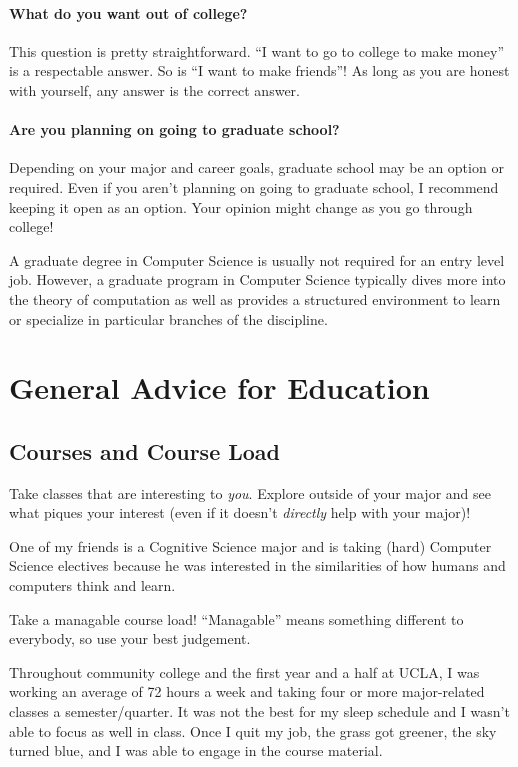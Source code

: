 \documentclass[11pt]{article}
\newenvironment{example}{
\begin{tcolorbox}[title=Example, colback=blue!5!white, colframe=black!75!blue]
}{ \end{tcolorbox} }
\renewcommand{\it}[1]{\textit{{#1}}}
\begin{document}
\paragraph{What do you want out of college?} This question is pretty
straightforward. ``I want to go to college to make money'' is a respectable
answer. So is ``I want to make friends''! As long as you are honest with
yourself, any answer is the correct answer.

\paragraph{Are you planning on going to graduate school?} Depending on your
major and career goals, graduate school may be an option or required. Even if
you aren't planning on going to graduate school, I recommend keeping it open as
an option. Your opinion might change as you go through college!
\begin{example}
  A graduate degree in Computer Science is usually not required for an entry
  level job. However, a graduate program in Computer Science typically dives
  more into the theory of computation as well as provides a structured
  environment to learn or specialize in particular branches of the discipline.
\end{example}


\newpage
\section{General Advice for Education}
\subsection{Courses and Course Load}
Take classes that are interesting to \it{you}. Explore outside of your major and
see what piques your interest (even if it doesn't \it{directly} help with your
major)!
\begin{example}
  One of my friends is a Cognitive Science major and is taking (hard) Computer
  Science electives because he was interested in the similarities of
  how humans and computers think and learn.
\end{example}

Take a managable course load! ``Managable'' means something different to
everybody, so use your best judgement.
\begin{example}
  Throughout community college and the first year and a half at UCLA, I was
  working an average of 72 hours a week and taking four or more major-related
  classes a semester/quarter. It was not the best for my sleep schedule and I
  wasn't able to focus as well in class. Once I quit my job, the grass got
  greener, the sky turned blue, and I was able to engage in the course material.
\end{example}
\end{document}
